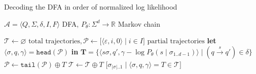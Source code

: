 \documentclass{beamer}
\begin{document}
\begin{frame}[fragile]{Decoding the DFA in order of normalized log likelihood}
\vspace{-0.3cm}
\begin{algorithm}[H]
\caption{Steerable DFA walk}
\label{alg:adaptive}
\begin{algorithmic}[1]
\Require $\mathcal{A} = \langle Q, \Sigma, \delta, I, F\rangle$ DFA, $P_\theta: \Sigma^d \rightarrow \mathbb{R}$ Markov chain

\State $\mathcal{T} \gets \varnothing \text{ total trajectories}, \mathcal{P} \gets \big[\langle \varepsilon, i, 0\rangle \mid i \in I\big] \text{ partial trajectories}$
\Repeat
\State \textbf{let }$\langle \sigma, q, \gamma \rangle = \texttt{head}(\mathcal{P})$ \textbf{in}
\State {}$\mathbf{T} = \big\{\langle s\sigma, q', \gamma - \log P_\theta(s \mid \sigma_{1..d-1}) \rangle\mid (q\overset{s}{\rightarrow}q') \in \delta\big\}$
\State $\mathcal{P} \gets \texttt{tail}(\mathcal{P}) \oplus T$ 
\EndIf
{}
\State $\mathcal{T} \gets \mathcal{T} \oplus T$ 
\EndIf
\EndFor
{}
\State \Return $\big[\sigma_{|\sigma|..1} \mid \langle \sigma, q, \gamma \rangle = T \in \mathcal{T}\big]$ 
\end{algorithmic}
\end{algorithm}
\end{frame}
\end{document}
